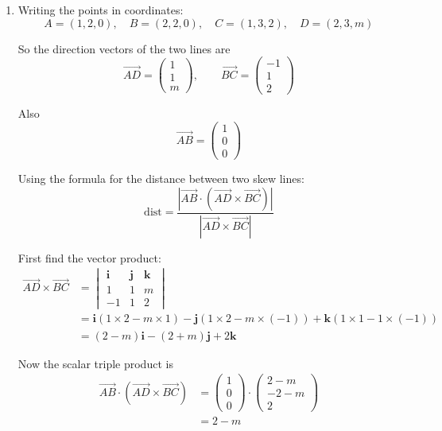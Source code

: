 \documentclass[leqno]{article}
\begin{document}
\begin{enumerate}[
  label=\textbf{\arabic*.},
  leftmargin=*,
  topsep=0pt,
  partopsep=0pt,
  parsep=0pt
]
\vspace*{10pt}

\begin{djsSolution}
\begin{enumerate}[label=\textbf{(\alph*)}]
\item Writing the points in coordinates:
\[
A=(1,2,0),\quad B=(2,2,0),\quad C=(1,3,2),\quad D=(2,3,m)
\]

So the direction vectors of the two lines are
\[
\overrightarrow{AD}=\begin{pmatrix}1\\1\\m\end{pmatrix},\qquad \overrightarrow{BC}=\begin{pmatrix}-1\\1\\2\end{pmatrix}
\]

Also
\[
\overrightarrow{AB}=\begin{pmatrix}1\\0\\0\end{pmatrix}
\]

Using the formula for the distance between two skew lines:
\[
\mathrm{dist}=\frac{\left\lvert \overrightarrow{AB}\cdot\left(\overrightarrow{AD}\times\overrightarrow{BC}\right)\right\rvert}{\left\lvert \overrightarrow{AD}\times\overrightarrow{BC}\right\rvert}
\]

First find the vector product:
\begin{align*}
\overrightarrow{AD}\times\overrightarrow{BC}
&=
\begin{vmatrix}
\mathbf i & \mathbf j & \mathbf k\\
1 & 1 & m\\
-1 & 1 & 2
\end{vmatrix} \\
&= \mathbf i(1\times 2-m\times 1)-\mathbf j(1\times 2-m\times(-1))+\mathbf k(1\times 1-1\times(-1)) \\
&= (2-m)\mathbf i-(2+m)\mathbf j+2\mathbf k
\end{align*}

Now the scalar triple product is
\begin{align*}
\overrightarrow{AB}\cdot\left(\overrightarrow{AD}\times\overrightarrow{BC}\right)
&=\begin{pmatrix}1\\0\\0\end{pmatrix}\cdot\begin{pmatrix}2-m\\-2-m\\2\end{pmatrix} \\
&=2-m
\end{align*}


\end{enumerate}
\end{djsSolution}
\end{enumerate}
\end{document}
